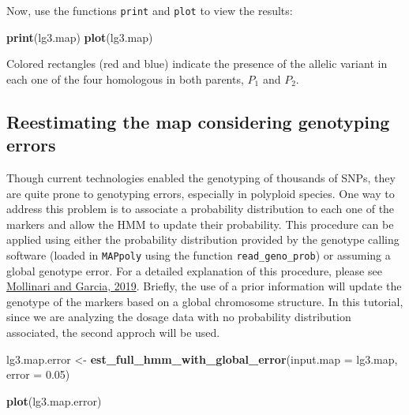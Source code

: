 \documentclass[
]{article}
\newenvironment{Shaded}{}{}
\newcommand{\DataTypeTok}[1]{\textcolor[rgb]{0.56,0.13,0.00}{#1}}
\newcommand{\FloatTok}[1]{\textcolor[rgb]{0.25,0.63,0.44}{#1}}
\newcommand{\KeywordTok}[1]{\textcolor[rgb]{0.00,0.44,0.13}{\textbf{#1}}}
\newcommand{\NormalTok}[1]{#1}
\newcommand{\StringTok}[1]{\textcolor[rgb]{0.25,0.44,0.63}{#1}}
\begin{document}
Now, use the functions \texttt{print} and \texttt{plot} to view the
results:

\begin{Shaded}
\begin{Highlighting}[]
\KeywordTok{print}\NormalTok{(lg3.map)}
\KeywordTok{plot}\NormalTok{(lg3.map)}
\end{Highlighting}
\end{Shaded}

Colored rectangles (red and blue) indicate the presence of the allelic
variant in each one of the four homologous in both parents, \(P_1\) and
\(P_2\).

\hypertarget{reestimating-the-map-considering-genotyping-errors}{%
\subsection{Reestimating the map considering genotyping
errors}\label{reestimating-the-map-considering-genotyping-errors}}

Though current technologies enabled the genotyping of thousands of SNPs,
they are quite prone to genotyping errors, especially in polyploid
species. One way to address this problem is to associate a probability
distribution to each one of the markers and allow the HMM to update
their probability. This procedure can be applied using either the
probability distribution provided by the genotype calling software
(loaded in \texttt{MAPpoly} using the function
\texttt{read\_geno\_prob}) or assuming a global genotype error. For a
detailed explanation of this procedure, please see
\href{https://doi.org/10.1534/g3.119.400378}{Mollinari and Garcia,
2019}. Briefly, the use of a prior information will update the genotype
of the markers based on a global chromosome structure. In this tutorial,
since we are analyzing the dosage data with no probability distribution
associated, the second approch will be used.

\begin{Shaded}
\begin{Highlighting}[]
\NormalTok{lg3.map.error <-}\StringTok{ }\KeywordTok{est_full_hmm_with_global_error}\NormalTok{(}\DataTypeTok{input.map =}\NormalTok{ lg3.map, }\DataTypeTok{error =} \FloatTok{0.05}\NormalTok{)}
\end{Highlighting}
\end{Shaded}

\begin{Shaded}
\begin{Highlighting}[]
\KeywordTok{plot}\NormalTok{(lg3.map.error)}
\end{Highlighting}
\end{Shaded}
\end{document}
